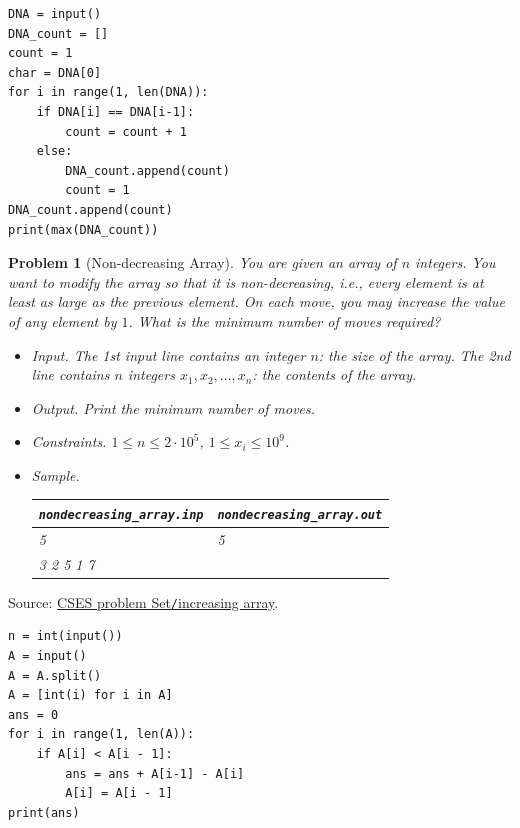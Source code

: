 \documentclass{article}
\newtheorem{problem}{Problem}
\begin{document}
\begin{verbatim}
DNA = input()
DNA_count = []
count = 1
char = DNA[0]
for i in range(1, len(DNA)):
    if DNA[i] == DNA[i-1]:
        count = count + 1
    else:
        DNA_count.append(count)
        count = 1
DNA_count.append(count)
print(max(DNA_count))
\end{verbatim}

\begin{problem}[Non-decreasing Array]
	You are given an array of $n$ integers. You want to modify the array so that it is non-decreasing, i.e., every element is at least as large as the previous element. On each move, you may increase the value of any element by $1$. What is the minimum number of moves required?
	\begin{itemize}
		\item {\sf Input.} The 1st input line contains an integer $n$: the size of the array. The 2nd line contains $n$ integers $x_1,x_2,\ldots,x_n$: the contents of the array.
		\item {\sf Output.} Print the minimum number of moves.
		\item {\sf Constraints.} $1\le n\le2\cdot10^5$, $1\le x_i\le10^9$.
		\item {\sf Sample.}
		\begin{table}[H]
			\centering
			\begin{tabular}{|l|l|}
				\hline
				\verb|nondecreasing_array.inp| & \verb|nondecreasing_array.out| \\
				\hline
				5 & 5 \\
				3 2 5 1 7 & \\
				\hline
			\end{tabular}
		\end{table}
	\end{itemize}
\end{problem}
Source: \href{https://cses.fi/problemset/task/1094}{CSES problem Set\texttt{/}increasing array}.

\begin{verbatim}
n = int(input())
A = input()
A = A.split()
A = [int(i) for i in A]
ans = 0
for i in range(1, len(A)):
    if A[i] < A[i - 1]:
        ans = ans + A[i-1] - A[i]
        A[i] = A[i - 1]
print(ans)
\end{verbatim}
\end{document}
